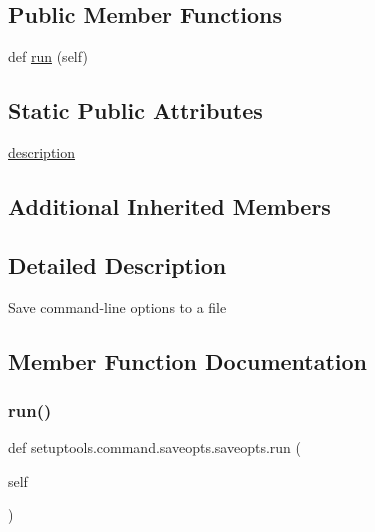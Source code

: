 \subsection*{Public Member Functions}
\begin{DoxyCompactItemize}
\item 
def \hyperlink{classsetuptools_1_1command_1_1saveopts_1_1saveopts_a940f6b5dbe02cbfb72342fd1fd14920b}{run} (self)
\end{DoxyCompactItemize}
\subsection*{Static Public Attributes}
\begin{DoxyCompactItemize}
\item 
\hyperlink{classsetuptools_1_1command_1_1saveopts_1_1saveopts_af78e92ede2fea32591d26970188c9fd9}{description}
\end{DoxyCompactItemize}
\subsection*{Additional Inherited Members}


\subsection{Detailed Description}
\begin{DoxyVerb}Save command-line options to a file\end{DoxyVerb}
 

\subsection{Member Function Documentation}
\mbox{\label{classsetuptools_1_1command_1_1saveopts_1_1saveopts_a940f6b5dbe02cbfb72342fd1fd14920b}} 
\subsubsection{\texorpdfstring{run()}{run()}}
{\footnotesize\ttfamily def setuptools.\+command.\+saveopts.\+saveopts.\+run (\begin{DoxyParamCaption}\item[{}]{self }\end{DoxyParamCaption})}




